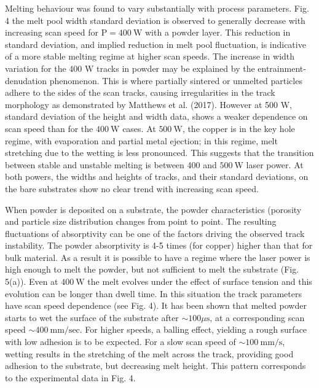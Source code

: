 \documentclass[10pt]{article}
\begin{document}
Melting behaviour was found to vary substantially with process parameters. Fig. 4 the melt pool width standard deviation is observed to generally decrease with increasing scan speed for $\mathrm{P}=400 \mathrm{~W}$ with a powder layer. This reduction in standard deviation, and implied reduction in melt pool fluctuation, is indicative of a more stable melting regime at higher scan speeds. The increase in width variation for the 400 $\mathrm{W}$ tracks in powder may be explained by the entrainment-denudation phenomenon. This is where partially sintered or unmelted particles adhere to the sides of the scan tracks, causing irregularities in the track morphology as demonstrated by Matthews et al. (2017). However at 500 $\mathrm{W}$, standard deviation of the height and width data, shows a weaker dependence on scan speed than for the $400 \mathrm{~W}$ cases. At $500 \mathrm{~W}$, the copper is in the key hole regime, with evaporation and partial metal ejection; in this regime, melt stretching due to the wetting is less pronounced. This suggests that the transition between stable and unstable melting is between 400 and $500 \mathrm{~W}$ laser power. At both powers, the widths and heights of tracks, and their standard deviations, on the bare substrates show no clear trend with increasing scan speed.

When powder is deposited on a substrate, the powder characteristics (porosity and particle size distribution changes from point to point. The resulting fluctuations of absorptivity can be one of the factors driving the observed track instability. The powder absorptivity is 4-5 times (for copper) higher than that for bulk material. As a result it is possible to have a regime where the laser power is high enough to melt the powder, but not sufficient to melt the substrate (Fig. 5(a)). Even at $400 \mathrm{~W}$ the melt evolves under the effect of surface tension and this evolution can be longer than dwell time. In this situation the track parameters have scan speed dependence (see Fig. 4). It has been shown that melted powder starts to wet the surface of the substrate after $\sim 100 \mu \mathrm{s}$, at a corresponding scan speed $\sim 400 \mathrm{~mm} / \mathrm{sec}$. For higher speeds, a balling effect, yielding a rough surface with low adhesion is to be expected. For a slow scan speed of $\sim 100 \mathrm{~mm} / \mathrm{s}$, wetting results in the stretching of the melt across the track, providing good adhesion to the substrate, but decreasing melt height. This pattern corresponds to the experimental data in Fig. 4.
\end{document}
